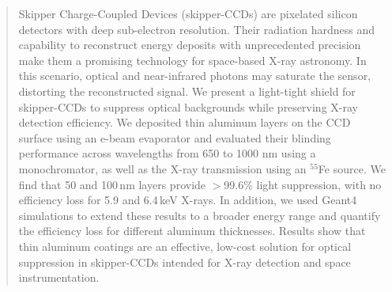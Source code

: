 \documentclass[twocolumn]{aastex631}
\begin{document}
\begin{abstract}

Skipper Charge-Coupled Devices (skipper-CCDs) are pixelated silicon detectors with deep sub-electron resolution. Their radiation hardness and capability to reconstruct energy deposits with unprecedented precision make them a promising technology for space-based X-ray astronomy. In this scenario, optical and near-infrared photons may saturate the sensor, distorting the reconstructed signal. We present a light-tight shield for skipper-CCDs to suppress optical backgrounds while preserving X-ray detection efficiency. We deposited thin aluminum layers on the CCD surface using an e-beam evaporator and evaluated their blinding performance across wavelengths from 650 to 1000 nm using a monochromator, as well as the X-ray transmission using an $^{55}$Fe source. We find that 50 and 100\,nm layers provide $>$99.6\% light suppression, with no efficiency loss for 5.9 and 6.4\,keV X-rays. In addition, we used Geant4 simulations to extend these results to a broader energy range and quantify the efficiency loss for different aluminum thicknesses. Results show that thin aluminum coatings are an effective, low-cost solution for optical suppression in skipper-CCDs intended for X-ray detection and space instrumentation.

\end{abstract}

\keywords{}

\end{document}
